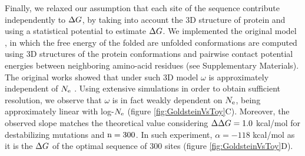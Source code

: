 \documentclass{article}
\begin{document}
	Finally, we relaxed our assumption that each site of the sequence contribute independently to $\Delta G$, by taking into account the $3$D structure of protein and using a statistical potential to estimate $\Delta G$.
	We implemented the original model \cite{Williams2006, Goldstein2011, Pollock2012}, in which the free energy of the folded are unfolded conformations are computed using $3$D structures of the protein conformations and pairwise contact potential energies between neighboring amino-acid residues \cite{Miyazawa1985} (see Supplementary Materials).
	The original works showed that under such $3$D model $\omega$ is approximately independent of $N_{\mathrm{e}}$ \cite{Goldstein2013}.
	Using extensive simulations in order to obtain sufficient resolution, we observe that $\omega$ is in fact weakly dependent on $N_{\mathrm{e}}$, being approximately linear with log-$N_{\mathrm{e}}$ (figure \ref{fig:GoldsteinVsToy}C).
	Moreover, the observed slope matches the theoretical value considering $\Delta \Delta G = 1.0$ kcal/mol for destabilizing mutations and $\text{n}=300$. 
	In such experiment, $\alpha=-118$ kcal/mol as it is the $\Delta G$ of the optimal sequence of $300$ sites \cite{Goldstein2011} (figure \ref{fig:GoldsteinVsToy}D).
\end{document}

